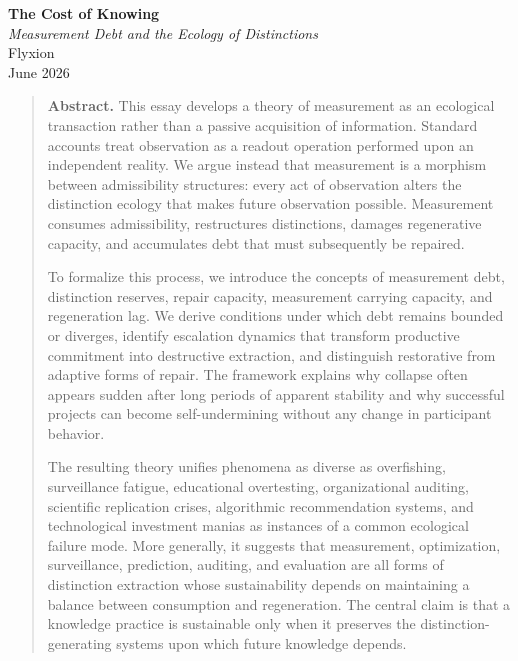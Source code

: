 \documentclass[12pt, a4paper]{article}
\theoremstyle{flyxion}
\begin{document}

\begin{center}
  {\LARGE\bfseries The Cost of Knowing}\\[0.4em]
  {\large\itshape Measurement Debt and the Ecology of Distinctions}\\[1.2em]
  {\normalsize Flyxion}\\[0.2em]
  {\small June 2026}
\end{center}

\vspace{1.2em}


\begin{quote}
\noindent\textbf{Abstract.}\enspace
This essay develops a theory of measurement as an ecological transaction rather than a passive acquisition of information. Standard accounts treat observation as a readout operation performed upon an independent reality. We argue instead that measurement is a morphism between admissibility structures: every act of observation alters the distinction ecology that makes future observation possible. Measurement consumes admissibility, restructures distinctions, damages regenerative capacity, and accumulates debt that must subsequently be repaired.

To formalize this process, we introduce the concepts of measurement debt, distinction reserves, repair capacity, measurement carrying capacity, and regeneration lag. We derive conditions under which debt remains bounded or diverges, identify escalation dynamics that transform productive commitment into destructive extraction, and distinguish restorative from adaptive forms of repair. The framework explains why collapse often appears sudden after long periods of apparent stability and why successful projects can become self-undermining without any change in participant behavior.

The resulting theory unifies phenomena as diverse as overfishing, surveillance fatigue, educational overtesting, organizational auditing, scientific replication crises, algorithmic recommendation systems, and technological investment manias as instances of a common ecological failure mode. More generally, it suggests that measurement, optimization, surveillance, prediction, auditing, and evaluation are all forms of distinction extraction whose sustainability depends on maintaining a balance between consumption and regeneration. The central claim is that a knowledge practice is sustainable only when it preserves the distinction-generating systems upon which future knowledge depends.
\end{quote}
\end{document}
